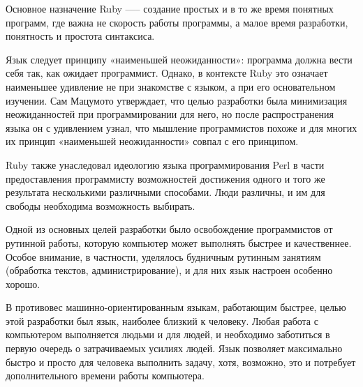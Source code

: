 Основное назначение Ruby —-- создание простых и в то же время понятных программ, где важна не скорость работы программы, а малое время разработки, понятность и простота синтаксиса.

Язык следует принципу «наименьшей неожиданности»: программа должна вести себя так, как ожидает программист. Однако, в контексте Ruby это означает наименьшее удивление не при знакомстве с языком, а при его основательном изучении. Сам Мацумото утверждает, что целью разработки была минимизация неожиданностей при программировании для него, но после распространения языка он с удивлением узнал, что мышление программистов похоже и для многих их принцип «наименьшей неожиданности» совпал с его принципом.

Ruby также унаследовал идеологию языка программирования Perl в части предоставления программисту возможностей достижения одного и того же результата несколькими различными способами. Люди различны, и им для свободы необходима возможность выбирать.

Одной из основных целей разработки было освобождение программистов от рутинной работы, которую компьютер может выполнять быстрее и качественнее. Особое внимание, в частности, уделялось будничным рутинным занятиям (обработка текстов, администрирование), и для них язык настроен особенно хорошо.

В противовес машинно-ориентированным языкам, работающим быстрее, целью этой разработки был язык, наиболее близкий к человеку. Любая работа с компьютером выполняется людьми и для людей, и необходимо заботиться в первую очередь о затрачиваемых усилиях людей. Язык позволяет максимально быстро и просто для человека выполнить задачу, хотя, возможно, это и потребует дополнительного времени работы компьютера.

